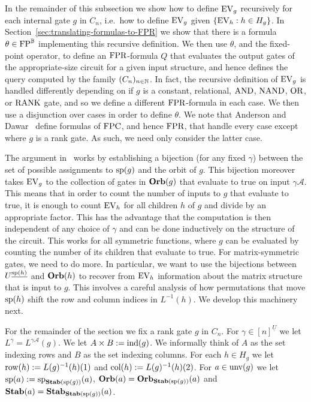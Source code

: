 \documentclass[../main/thesis.tex]{subfiles}
\begin{document}
In the remainder of this subsection we show how to define $\text{EV}_g$ recursively
for each internal gate $g$ in $C_n$, i.e.\ how to define $\text{EV}_g$ given $\{\text{EV}_h
: h \in H_g \}$. In Section~\ref{sec:translating-formulas-to-FPR} we show that
there is a formula $\theta \in \text{\upshape FP}^{\mathbb{B}}$ implementing this recursive definition. We
then use $\theta$, and the fixed-point operator, to define an $\text{\upshape FPR}$-formula $Q$
that evaluates the output gates of the appropriate-size circuit for a given
input structure, and hence defines the query computed by the family $(C_n)_{n
  \in \mathbb{N}}$. In fact, the recursive definition of $\text{EV}_g$ is handled
differently depending on if $g$ is a constant, relational, $\text{\upshape AND}$, $\text{\upshape NAND}$,
$\text{\upshape OR}$, or $\text{\upshape RANK}$ gate, and so we define a different $\text{\upshape FPR}$-formula in each
case. We then use a disjunction over cases in order to define $\theta$. We note
that Anderson and Dawar~\cite{AndersonD17} define formulas of $\text{\upshape FPC}$, and hence
$\text{\upshape FPR}$, that handle every case except where $g$ is a rank gate. As such, we need
only consider the latter case.

The argument in~\cite{AndersonD17} works by establishing a bijection (for any
fixed $\gamma$) between the set of possible assignments to $\text{sp}(g)$ and the
orbit of $g$. This bijection moreover takes $\text{EV}_g$ to the collection of gates
in $\text{\textbf{Orb}}(g)$ that evaluate to true on input $\gamma\mathcal{A}$. This means that
in order to count the number of inputs to $g$ that evaluate to true, it is
enough to count $\text{EV}_h$ for all children $h$ of $g$ and divide by an appropriate
factor. This has the advantage that the computation is then independent of any
choice of $\gamma$ and can be done inductively on the structure of the circuit.
This works for all symmetric functions, where $g$ can be evaluated by counting
the number of its children that evaluate to true. For matrix-symmetric gates, we
need to do more. In particular, we want to use the bijections between
$U^{\underline{\text{sp}(h)}}$ and $\text{\textbf{Orb}}(h)$ to recover from $\text{EV}_h$ information
about the matrix structure that is input to $g$. This involves a careful
analysis of how permutations that move $\text{sp}(h)$ shift the row and column
indices in $L^{-1}(h)$. We develop this machinery next.

For the remainder of the section we fix a rank gate $g$ in $C_n$. For $\gamma
\in [n]^{\underline{U}}$ we let $L^{\gamma} = L^{\gamma \mathcal{A}}(g)$. We let
$A \times B := \text{\upshape ind}(g)$. We informally think of $A$ as the set indexing rows and
$B$ as the set indexing columns. For each $h \in H_g$ we let $\text{row}(h) :=
L(g)^{-1}(h)(1)$ and $\text{col}(h) := L(g)^{-1}(h)(2)$. For $a \in \text{unv}(g)$
we let $\text{sp}(a) := \text{sp}_{\text{\textbf{Stab}} (\text{sp} (g))}(a)$, $\text{\textbf{Orb}}(a) = \text{\textbf{Orb}}_{\text{\textbf{Stab}} (\text{sp} (g))}(a)$
and $\text{\textbf{Stab}}(a) = \text{\textbf{Stab}}_{\text{\textbf{Stab}} (\text{sp} (g))}(a)$.
\end{document}
